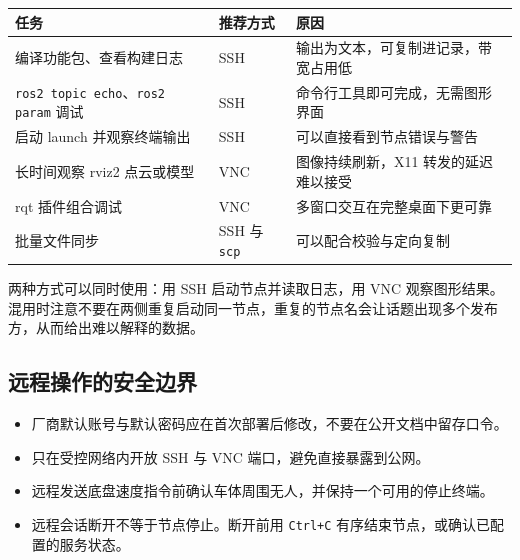 \begin{longtable}[]{@{}
  >{\raggedright\arraybackslash}p{}
  >{\raggedright\arraybackslash}p{}
  >{\raggedright\arraybackslash}p{}@{}}
\toprule\noalign{}
\begin{minipage}[b]{\linewidth}\raggedright
任务
\end{minipage} & \begin{minipage}[b]{\linewidth}\raggedright
推荐方式
\end{minipage} & \begin{minipage}[b]{\linewidth}\raggedright
原因
\end{minipage} \\
\midrule\noalign{}
\endhead
\bottomrule\noalign{}
\endlastfoot
编译功能包、查看构建日志 & SSH & 输出为文本，可复制进记录，带宽占用低 \\
\passthrough{\lstinline!ros2 topic echo!}、\passthrough{\lstinline!ros2 param!}
调试 & SSH & 命令行工具即可完成，无需图形界面 \\
启动 launch 并观察终端输出 & SSH & 可以直接看到节点错误与警告 \\
长时间观察 rviz2 点云或模型 & VNC & 图像持续刷新，X11
转发的延迟难以接受 \\
rqt 插件组合调试 & VNC & 多窗口交互在完整桌面下更可靠 \\
批量文件同步 & SSH 与 \passthrough{\lstinline!scp!} &
可以配合校验与定向复制 \\
\end{longtable}

两种方式可以同时使用：用 SSH 启动节点并读取日志，用 VNC
观察图形结果。混用时注意不要在两侧重复启动同一节点，重复的节点名会让话题出现多个发布方，从而给出难以解释的数据。

\subsection{远程操作的安全边界}\label{ux8fdcux7a0bux64cdux4f5cux7684ux5b89ux5168ux8fb9ux754c}

\begin{itemize}
\tightlist
\item
  厂商默认账号与默认密码应在首次部署后修改，不要在公开文档中留存口令。
\item
  只在受控网络内开放 SSH 与 VNC 端口，避免直接暴露到公网。
\item
  远程发送底盘速度指令前确认车体周围无人，并保持一个可用的停止终端。
\item
  远程会话断开不等于节点停止。断开前用 \passthrough{\lstinline!Ctrl+C!}
  有序结束节点，或确认已配置的服务状态。
\end{itemize}

